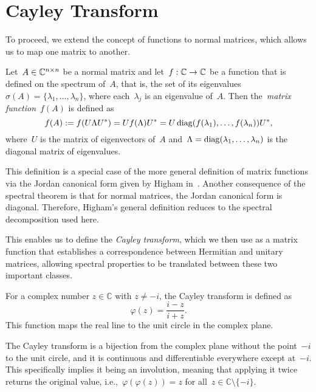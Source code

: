 \section{Cayley Transform}

To proceed, we extend the concept of functions to normal matrices, which allows us to map one matrix to another.

\begin{definition} \label{def:matrix_function}
Let~$A \in \mathbb{C}^{n \times n}$ be a normal matrix and let~$f: \mathbb{C} \to \mathbb{C}$ be a function that is defined on the spectrum of~$A$, that is, the set of its eigenvalues $\sigma(A) = \{\lambda_1, \ldots, \lambda_n\}$, where each~$\lambda_j$ is an eigenvalue of~$A$. Then the~\emph{matrix function}~$f(A)$ is defined as
\[
f(A) := f(U \Lambda U^*) = U f(\Lambda) U^* = U \operatorname{diag}(f(\lambda_1), \ldots, f(\lambda_n)) U^*,
\]
where~$U$ is the matrix of eigenvectors of~$A$ and~$\Lambda = \operatorname{diag}(\lambda_1, \ldots, \lambda_n)$ is the diagonal matrix of eigenvalues.
\end{definition}

This definition is a special case of the more general definition of matrix functions via the Jordan canonical form given by Higham in~\cite[p.~3]{higham}. Another consequence of the spectral theorem is that for normal matrices, the Jordan canonical form is diagonal. Therefore, Higham's general definition reduces to the spectral decomposition used here.

This enables us to define the \emph{Cayley transform}, which we then use as a matrix function that establishes a correspondence between Hermitian and unitary matrices, allowing spectral properties to be translated between these two important classes.

For a complex number $z \in \mathbb{C}$ with $z \neq -i$, the Cayley transform is defined as
\[
\varphi(z) = \frac{i - z}{i + z}.
\]
This function maps the real line to the unit circle in the complex plane.
\vspace{0.5cm}

\noindent
The Cayley transform is a bijection from the complex plane without the point~$-i$ to the unit circle, and it is continuous and differentiable everywhere except at~$-i$. This specifically implies it being an involution, meaning that applying it twice returns the original value, i.e.,~$\varphi(\varphi(z)) = z$ for all~$z \in \mathbb{C} \setminus \{-i\}$.

